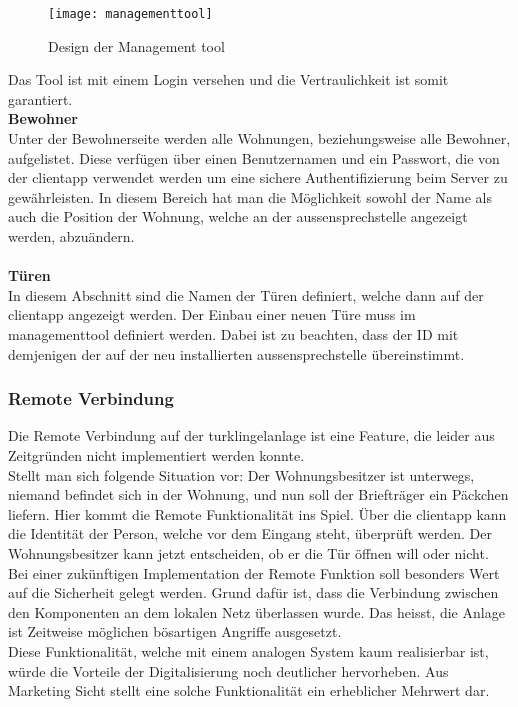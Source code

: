\begin{figure}[htb!]
	\begin{center}
		\texttt{[image: managementtool]}
		\caption[Design der Management tool]{Design der Management tool}
		\label{fig:managementtool}
	\end{center}
\end{figure}

Das Tool ist mit einem Login versehen und die Vertraulichkeit ist somit garantiert.
\\
\newline
\textbf{Bewohner} 
\\
Unter der Bewohnerseite werden alle Wohnungen, beziehungsweise alle Bewohner, aufgelistet. Diese verfügen über einen Benutzernamen und ein Passwort, die von der \gls{clientapp} verwendet werden um eine sichere Authentifizierung beim Server zu gewährleisten. In diesem Bereich hat man die Möglichkeit sowohl der Name als auch die Position der Wohnung, welche an der \gls{aussensprechstelle} angezeigt werden, abzuändern.
\\
\\
\textbf{Türen} 
\\
In diesem Abschnitt sind die Namen der Türen definiert, welche dann auf der \gls{clientapp} angezeigt werden. Der Einbau einer neuen Türe muss im \gls{managementtool} definiert werden. Dabei ist zu beachten, dass der ID mit demjenigen der auf der neu installierten \gls{aussensprechstelle} übereinstimmt. 
\\

\subsubsection{Remote Verbindung}
\label{kap:remote}
Die Remote Verbindung auf der \gls{turklingelanlage} ist eine Feature, die leider aus Zeitgründen nicht implementiert werden konnte. 
\\
Stellt man sich folgende Situation vor: Der Wohnungsbesitzer ist unterwegs, niemand befindet sich in der Wohnung, und nun soll der Briefträger ein Päckchen liefern. Hier kommt die Remote Funktionalität ins Spiel. Über die \gls{clientapp} kann die Identität der Person, welche vor dem Eingang steht, überprüft werden. Der Wohnungsbesitzer kann jetzt entscheiden, ob er die Tür öffnen will oder nicht. Bei einer zukünftigen Implementation der Remote Funktion soll besonders Wert auf die Sicherheit gelegt werden. Grund dafür ist, dass die Verbindung zwischen den Komponenten an dem lokalen Netz überlassen wurde. Das heisst, die Anlage ist Zeitweise möglichen bösartigen Angriffe ausgesetzt. 
\\
Diese Funktionalität, welche mit einem analogen System kaum realisierbar ist, würde die Vorteile der Digitalisierung noch deutlicher hervorheben. Aus Marketing Sicht stellt eine solche Funktionalität ein erheblicher Mehrwert dar. 


